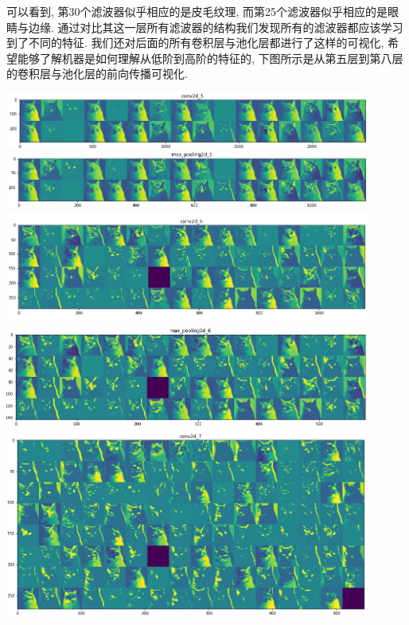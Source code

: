 \documentclass[lang=cn,11pt]{elegantpaper}
\begin{document}
可以看到, 第30个滤波器似乎相应的是皮毛纹理, 而第25个滤波器似乎相应的是眼睛与边缘. 通过对比其这一层所有滤波器的结构我们发现所有的滤波器都应该学习到了不同的特征. 我们还对后面的所有卷积层与池化层都进行了这样的可视化, 希望能够了解机器是如何理解从低阶到高阶的特征的, 下图所示是从第五层到第八层的卷积层与池化层的前向传播可视化. 
\begin{center}
\includegraphics[width=0.9\textwidth]{conv2d_5.png}\\
\includegraphics[width=0.9\textwidth]{max_pooling2d_5}\\
\includegraphics[width=0.9\textwidth]{conv2d_6}\\
\includegraphics[width=0.9\textwidth]{max_pooling2d_6}\\
\includegraphics[width=0.9\textwidth]{conv2d_7}\\

\end{center}
\end{document}
